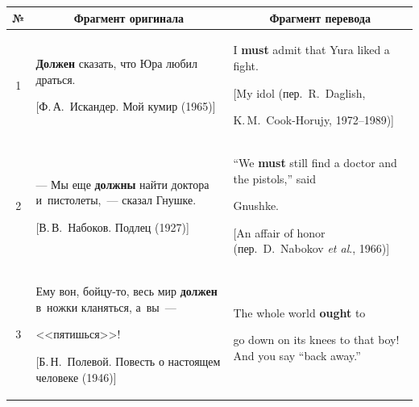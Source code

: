 \begin{table}\small %


\vspace*{-1pt}


\begin{center}




\vspace*{2ex}





\tabcolsep=5pt


\begin{tabular}{|c|p{57mm}|p{57mm}|}


\hline


№&\multicolumn{1}{|c|}{Фрагмент оригинала}&\multicolumn{1}{|c|}{Фрагмент перевода}\\


\hline


1&\textbf{Должен} сказать, что Юра любил драться.\newline


[Ф.\,А.~Искандер. Мой кумир (1965)]&I \textbf{must} admit that Yura liked a fight.\newline


[My idol (пер.\ R.~Daglish,  


K.\,M.~Cook-Horujy, 1972--1989)]\\


\hline


2&--- Мы еще \textbf{должны} найти доктора и~пистолеты,~--- сказал Гнушке.\newline


[В.\,В.~Набоков. Подлец (1927)]&``We \textbf{must} still find a doctor and the pistols,'' said 


Gnushke.\newline


[An affair of honor (пер.\ D.~Nabokov \textit{et al}., 1966)]\\


\hline


3&Ему вон, бойцу-то, весь мир \textbf{должен} в~ножки кланяться, а~вы~--- 


<<пятишься>>!\newline


[Б.\,Н.~Полевой. Повесть о настоящем человеке (1946)]&The whole world \textbf{ought} to 


go down on its knees to that boy! And you say ``back away.''\newline



\end{tabular}
\end{center}
\end{table}
